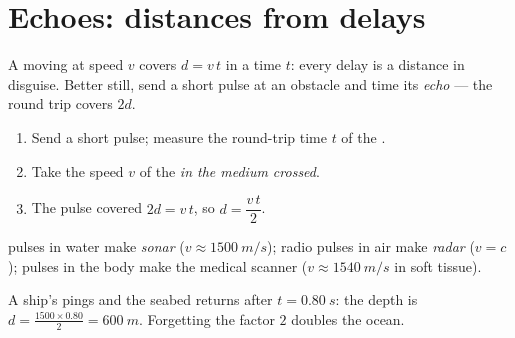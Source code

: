 \section{Echoes: distances from delays}

A  moving at speed $v$ covers $d = v\,t$ in a time $t$: every delay
is a distance in disguise. Better still, send a short pulse at an
obstacle and time its \emph{echo} --- the round trip covers $2d$.

\begin{method}\label{met:g10:signals-and-waves:echo}
\begin{enumerate}
  \item Send a short pulse; measure the round-trip time $t$ of the .
  \item Take the speed $v$ of the  \emph{in the medium crossed}.
  \item The pulse covered $2d = v\,t$, so $d = \dfrac{v\,t}{2}$.
\end{enumerate}
 pulses in water make \emph{sonar}
($v \approx \qty{1500}{m/s}$); radio pulses in air make
\emph{radar} ($v = c$);  pulses in the body make
the medical scanner ($v \approx \qty{1540}{m/s}$ in soft tissue).
\end{method}

\begin{example}[Sonar]\label{ex:g10:signals-and-waves:sonar}
A ship's  pings and the seabed  returns after
$t = \qty{0.80}{s}$: the depth is
$d = \frac{1500 \times 0.80}{2} = \qty{600}{m}$. Forgetting the factor
$2$ doubles the ocean.
\end{example}

